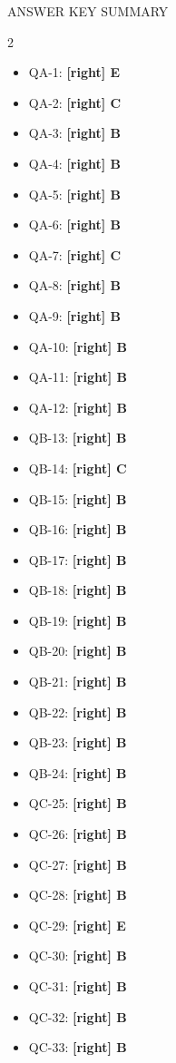 \documentclass[11pt,a4paper]{beamer}
\newcommand{\correct}[1]{\textcolor{green!50!black}{\textbf{[right] #1}}}
\begin{document}

\begin{frame}{ANSWER KEY SUMMARY}
\begin{multicols}{2}
\begin{itemize}
    \item QA-1: \correct{E}
    \item QA-2: \correct{C}
    \item QA-3: \correct{B}
    \item QA-4: \correct{B}
    \item QA-5: \correct{B}
    \item QA-6: \correct{B}
    \item QA-7: \correct{C}
    \item QA-8: \correct{B}
    \item QA-9: \correct{B}
    \item QA-10: \correct{B}
    \item QA-11: \correct{B}
    \item QA-12: \correct{B}
    \item QB-13: \correct{B}
    \item QB-14: \correct{C}
    \item QB-15: \correct{B}
    \item QB-16: \correct{B}
    \item QB-17: \correct{B}
    \item QB-18: \correct{B}
    \item QB-19: \correct{B}
    \item QB-20: \correct{B}
    \item QB-21: \correct{B}
    \item QB-22: \correct{B}
    \item QB-23: \correct{B}
    \item QB-24: \correct{B}
    \item QC-25: \correct{B}
    \item QC-26: \correct{B}
    \item QC-27: \correct{B}
    \item QC-28: \correct{B}
    \item QC-29: \correct{E}
    \item QC-30: \correct{B}
    \item QC-31: \correct{B}
    \item QC-32: \correct{B}
    \item QC-33: \correct{B}

\end{itemize}
\end{multicols}
\end{frame}
\end{document}
